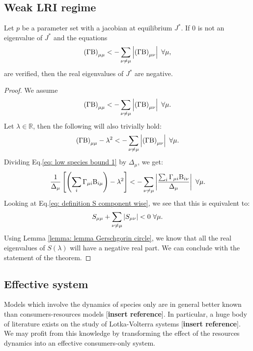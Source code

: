 \documentclass[12pt]{report}
\begin{document}
\subsection{Weak LRI regime}\label{sec : weak LRI regime}
\begin{theorem}
Let $p$ be a parameter set with a jacobian at equilibrium $J^*$. If $0$ is not an eigenvalue of $J^*$ and the equations
\begin{equation}
\left(\Gamma \text{B}\right)_{\mu\mu} < - \sum_{\nu \neq \mu } \left|{\left(\Gamma \text{B}\right)_{\mu \nu}}\right| \ \forall \mu,
\end{equation}
are verified, then the real eigenvalues of $J^*$ are negative.
\end{theorem}
\begin{proof}
We assume
\begin{equation}
\left(\Gamma \text{B}\right)_{\mu\mu} < - \sum_{\nu \neq \mu } \left|{\left(\Gamma \text{B}\right)_{\mu \nu}}\right|  \ \forall \mu.
\end{equation}
Let $\lambda \in \mathbb{R}$, then the following will also trivially hold:
\begin{equation}
  \left(\Gamma\Beta \right)_{\mu\mu} -\lambda^2 < - \sum_{\nu \neq \mu } \abs{\left(\Gamma \Beta\right)_{\mu \nu}} \ \forall \mu. \label{eq: low species bound 1}
\end{equation}
Dividing Eq.\eqref{eq: low species bound 1} by $\Delta_\mu$, we get:
\begin{equation}
\frac{1}{\Delta_\mu}\left[\left(\sum_i \Gamma_{\mu i} \Beta_{i \mu} \right)-{\lambda^2}\right] < - \sum_{\nu \neq \mu } \abs{\frac{\sum_i \Gamma_{\mu i}\Beta_{i\nu}}{\Delta_\mu}} \ \forall \mu.
\end{equation}
Looking at Eq.\eqref{eq: definition S component wise}, we see that this is equivalent to:
\begin{equation}
S_{\mu \mu} + \sum_{\nu \neq \mu} \left|{S_{\mu \nu}}\right| < 0\ \forall \mu.
\end{equation}
Using Lemma \ref{lemma: lemma Gerschgorin circle}, we know that all the real eigenvalues of $S(\lambda)$ will have a negative real part.
We can conclude with the statement of the theorem.
\end{proof}


\subsection{Effective system}
Models which involve the dynamics of species only are in general better known than consumers-resources models [\textbf{insert reference}]. In particular, a huge body of literature exists on the study of Lotka-Volterra systems [\textbf{insert reference}]. We may profit from this knowledge by transforming the effect of the resources dynamics into an effective consumers-only system.
\end{document}
